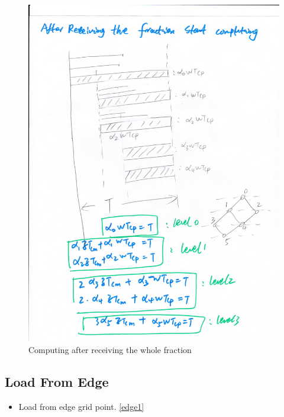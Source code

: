 \documentclass[preprint,12pt]{elsarticle}
\begin{document}
\begin{figure}[h]
\centering\includegraphics[width=1\linewidth]{eq2}
\caption{Computing after receiving the whole fraction}
\label{eq2}
\end{figure}



\subsection{Load From Edge}

\begin{itemize}
\item Load from edge grid point. \ref{edge1}
\end{itemize}
\end{document}
